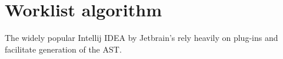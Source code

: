 \section{Worklist algorithm}
The widely popular Intellij IDEA by Jetbrain's rely heavily on plug-ins and facilitate generation of the AST.
 


